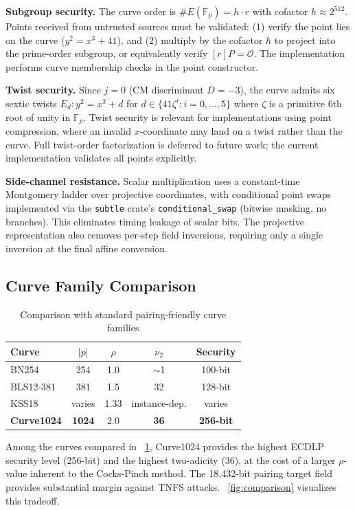 \textbf{Subgroup security.} The curve order is
\(\#E(\mathbb{F}_p) = h \cdot r\) with cofactor \(h \approx 2^{512}\).
Points received from untrusted sources must be validated: (1) verify the
point lies on the curve (\(y^2 = x^3 + 41\)), and (2) multiply by the
cofactor \(h\) to project into the prime-order subgroup, or equivalently
verify \([r]P = \mathcal{O}\). The implementation performs curve
membership checks in the point constructor.

\textbf{Twist security.} Since \(j = 0\) (CM discriminant \(D = -3\)),
the curve admits six sextic twists \(E_d: y^2 = x^3 + d\) for
\(d \in \{41\zeta^i : i = 0, \ldots, 5\}\) where \(\zeta\) is a
primitive 6th root of unity in \(\mathbb{F}_p\). Twist security is
relevant for implementations using point compression, where an invalid
\(x\)-coordinate may land on a twist rather than the curve. Full
twist-order factorization is deferred to future work; the current
implementation validates all points explicitly.

\textbf{Side-channel resistance.} Scalar multiplication uses a
constant-time Montgomery ladder over projective coordinates, with
conditional point swaps implemented via the \texttt{subtle} crate's
\texttt{conditional\_swap} (bitwise masking, no branches). This
eliminates timing leakage of scalar bits. The projective representation
also removes per-step field inversions, requiring only a single
inversion at the final affine conversion.

\subsection{Curve Family Comparison}\label{curve-family-comparison}

\begin{table}[t]
\centering
\caption{Comparison with standard pairing-friendly curve families}
\label{tab:comparison}
\scriptsize
\begin{tabular}{lcccc}
\toprule
Curve & $|p|$ & $\rho$ & $\nu_2$ & Security \\
\midrule
BN254 & 254 & 1.0 & $\sim$1 & 100-bit \\
BLS12-381 & 381 & 1.5 & 32 & 128-bit \\
KSS18 & varies & 1.33 & instance-dep. & varies \\
\textbf{Curve1024} & \textbf{1024} & 2.0 & \textbf{36} & \textbf{256-bit} \\
\bottomrule
\end{tabular}
\end{table}

Among the curves compared in \tablename~\ref{tab:comparison}, Curve1024
provides the highest ECDLP security level (256-bit) and the highest
two-adicity (36), at the cost of a larger \(\rho\)-value inherent to the
Cocks-Pinch method. The 18,432-bit pairing target field provides
substantial margin against TNFS attacks.
\figurename~\ref{fig:comparison} visualizes this tradeoff.



